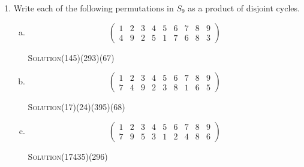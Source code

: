 \documentclass[twoside]{amsart}
\newcommand{\solution}{\textsc{Solution}\xspace}
\begin{document}
\begin{enumerate}[A.]
\begin{enumerate}[1]
\begin{enumerate}[(a)]
	 \item (147)(1678)(74132)

	 \solution \[
	              \begin{pmatrix}
	                 1 & 2 & 3 & 4 & 5 & 6 & 7 & 8 & 9 \\
			 3 & 8 & 2 & 6 & 5 & 1 & 7 & 4 & 9
		      \end{pmatrix}
	           \]

	 \item (6148)(2345)(12493)

	 \solution \[
	              \begin{pmatrix}
	                 1 & 2 & 3 & 4 & 5 & 6 & 7 & 8 & 9 \\
			 3 & 5 & 4 & 9 & 2 & 1 & 7 & 6 & 8
		      \end{pmatrix}
	           \]
      \end{enumerate}

      \item Write each of the following permutations in $S_9$ as a product
      of disjoint cycles.

      \begin{enumerate}[(a)]
         \item \[
	          \begin{pmatrix}
		      1 & 2 & 3 & 4 & 5 & 6 & 7 & 8 & 9 \\
		      4 & 9 & 2 & 5 & 1 & 7 & 6 & 8 & 3
		  \end{pmatrix}
	       \]

	 \solution (145)(293)(67)

         \item \[
	          \begin{pmatrix}
		      1 & 2 & 3 & 4 & 5 & 6 & 7 & 8 & 9 \\
		      7 & 4 & 9 & 2 & 3 & 8 & 1 & 6 & 5
		  \end{pmatrix}
	       \]

	 \solution (17)(24)(395)(68)
	 
         \item \[
	          \begin{pmatrix}
		      1 & 2 & 3 & 4 & 5 & 6 & 7 & 8 & 9 \\
		      7 & 9 & 5 & 3 & 1 & 2 & 4 & 8 & 6
		  \end{pmatrix}
	       \]

	 \solution (17435)(296)

      \end{enumerate}


\end{enumerate}
\end{enumerate}
\end{document}
